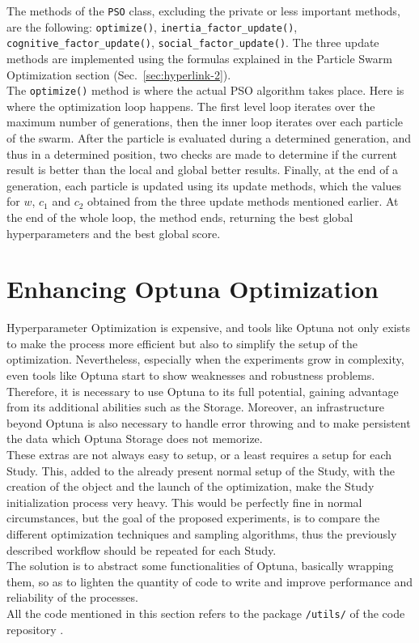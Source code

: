 %
The methods of the \texttt{PSO} class, excluding the private or less important methods, are the following: \texttt{optimize()}, \texttt{inertia\_factor\_update()}, \texttt{cognitive\_factor\_update()}, \texttt{social\_factor\_update()}.
The three update methods are implemented using the formulas explained in the Particle Swarm Optimization section (Sec.~\ref{sec:hyperlink-2}).
\\[0.3cm]The \texttt{optimize()} method is where the actual PSO algorithm takes place. Here is where the optimization loop happens. The first level loop iterates over the maximum number of generations, then the inner loop iterates over each particle of the swarm.
After the particle is evaluated during a determined generation, and thus in a determined position, two checks are made to determine if the current result is better than the local and global better results.
Finally, at the end of a generation, each particle is updated using its update methods, which the values for $w$, $c_1$ and $c_2$ obtained from the three update methods mentioned earlier.
At the end of the whole loop, the method ends, returning the best global hyperparameters and the best global score.

\section{Enhancing Optuna Optimization}

Hyperparameter Optimization is expensive, and tools like Optuna not only exists to make the process more efficient but also to simplify the setup of the optimization.
Nevertheless, especially when the experiments grow in complexity, even tools like Optuna start to show weaknesses and robustness problems.
\\[0.3cm]Therefore, it is necessary to use Optuna to its full potential, gaining advantage from its additional abilities such as the Storage. Moreover, an infrastructure beyond Optuna is also necessary to handle error throwing and to make persistent the data which Optuna Storage does not memorize.
\\[0.3cm]These extras are not always easy to setup, or a least requires a setup for each Study. This, added to the already present normal setup of the Study, with the creation of the object and the launch of the optimization, make the Study initialization process very heavy.
This would be perfectly fine in normal circumstances, but the goal of the proposed experiments, is to compare the different optimization techniques and sampling algorithms, thus the previously described workflow should be repeated for each Study.
\\[0.3cm]The solution is to abstract some functionalities of Optuna, basically wrapping them, so as to lighten the quantity of code to write and improve performance and reliability of the processes.
\\[0.3cm]All the code mentioned in this section refers to the package \texttt{/utils/} of the code repository \cite{Repository-THESIS}.


